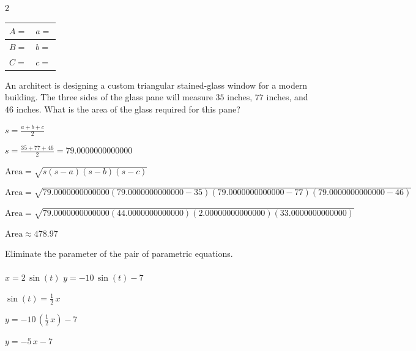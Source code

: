 \documentclass[11pt]{exam}
\begin{document}
\begin{questions}
\begin{multicols}{2}
\columnbreak

\renewcommand{\arraystretch}{2.5}
\begin{tabular}{|p{3cm}|p{3cm}|}\hline
   $A=$  & $a=$ \\\hline
   $B=$  & $b=$ \\\hline
   $C=$  & $c=$ \\\hline
\end{tabular}
\end{multicols}

\newpage

\question[3]
An architect is designing a custom triangular stained-glass window for a modern building. The three sides of the glass pane will measure \(35\) inches, \(77\) inches, and \(46\) inches. What is the area of the glass required for this pane?

%
\begin{solution}
\(s = \frac{a + b + c}{2}\)

\(s = \frac{35 + 77 + 46}{2} = 79.0000000000000\)

\(\text{Area} = \sqrt{s(s-a)(s-b)(s-c)}\)

\(\text{Area} = \sqrt{79.0000000000000(79.0000000000000-35)(79.0000000000000-77)(79.0000000000000-46)}\)

\(\text{Area} = \sqrt{79.0000000000000(44.0000000000000)(2.00000000000000)(33.0000000000000)}\)

\(\boxed{\text{Area} \approx 478.97}\)
\end{solution}
\answerline

\question[3] Eliminate the parameter of the pair of parametric equations.\\ \\
\(x = 2 \, \sin\left(t\right)\) \qquad \(y = -10 \, \sin\left(t\right) - 7\)
\begin{solution}
\(\sin\left(t\right) = \frac{1}{2} \, x\)

\(y = -10 \, \left(\frac{1}{2} \, x\right) - 7\)

\(\boxed{y = -5 \, x - 7}\)
\end{solution}
\answerline

\newpage

\end{questions}
\end{document}
